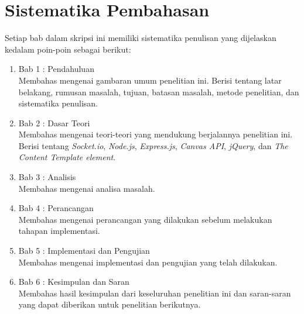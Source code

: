 \section{Sistematika Pembahasan}
\label{sec:sispem}
Setiap bab dalam skripsi ini memiliki sistematika penulisan yang dijelaskan kedalam poin-poin sebagai berikut:

\begin{enumerate}
	\item Bab 1 : Pendahuluan \\
	Membahas mengenai gambaran umum penelitian ini. Berisi tentang latar belakang, rumusan masalah, tujuan, batasan masalah, metode penelitian, dan sistematika penulisan.
	
	\item Bab 2 : Dasar Teori \\
	Membahas mengenai teori-teori yang mendukung berjalannya penelitian ini. Berisi tentang \textit{Socket.io}, \textit{Node.js},  \textit{Express.js}, \textit{Canvas API}, \textit{jQuery}, dan \textit{The Content Template element}.
	
	\item Bab 3 : Analisis \\
	Membahas mengenai analisa masalah.
	
	\item Bab 4 : Perancangan \\
	Membahas mengenai perancangan yang dilakukan sebelum melakukan tahapan implementasi.
	
	\item Bab 5 : Implementasi dan Pengujian \\
	Membahas mengenai implementasi dan pengujian yang telah dilakukan.
	
	\item Bab 6 : Kesimpulan dan Saran \\
	Membahas hasil kesimpulan dari keseluruhan penelitian ini dan saran-saran yang dapat diberikan untuk penelitian berikutnya.
\end{enumerate}